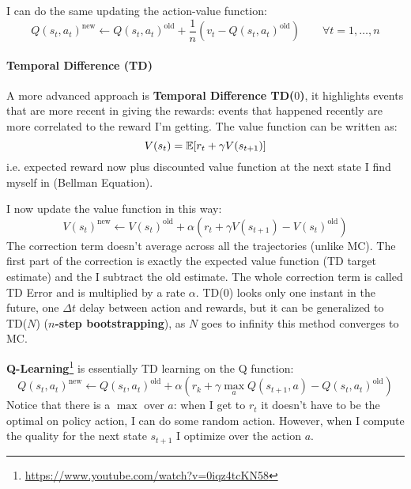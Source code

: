 I can do the same updating the action-value function:
\[
    \boxed{Q(s_t,a_t)^{\text{new}}\leftarrow Q(s_t,a_t)^{\text{old}} + \frac{1}{n} \left( v_t - Q(s_t,a_t)^{\text{old}} \right) \qquad \forall t=1,\ldots,n}
\]

\paragraph{Temporal Difference (TD)}
A more advanced approach is \textbf{Temporal Difference TD($0$)}, it highlights events that are more recent in giving the rewards: events that happened recently are more correlated to the reward I'm getting. The value function can be written as:
\[
    V(s_t) = \mathbb{E}[r_t + \gamma V(s_{t+1})]
\]
i.e. expected reward now plus discounted value function at the next state I find myself in (Bellman Equation).

I now update the value function in this way:
\[
    \boxed{V(s_t)^{\text{new}}\leftarrow V(s_t)^{\text{old}} + \alpha \left( r_t + \gamma V(s_{t+1}) - V(s_t)^{\text{old}} \right)}
\]
The correction term doesn't average across all the trajectories (unlike MC). The first part of the correction is exactly the expected value function (TD target estimate) and the I subtract the old estimate. The whole correction term is called TD Error and is multiplied by a rate $\alpha$. TD($0$) looks only one instant in the future, one $\Delta t$ delay between action and rewards, but it can be generalized to TD($N$) (\textbf{$n$-step bootstrapping}), as $N$ goes to infinity this method converges to MC.

\textbf{Q-Learning}\footnote{\url{https://www.youtube.com/watch?v=0iqz4tcKN58}} is essentially TD learning on the Q function:
\[
    \boxed{Q(s_t,a_t)^{\text{new}}\leftarrow Q(s_t,a_t)^{\text{old}} + \alpha \left( r_k + \gamma \max_aQ(s_{t+1},a) - Q(s_t,a_t)^{\text{old}} \right)}
\]
Notice that there is a $\max$ over $a$: when I get to $r_t$ it doesn't have to be the optimal on policy action, I can do some random action. However, when I compute the quality for the next state $s_{t+1}$ I optimize over the action $a$.

